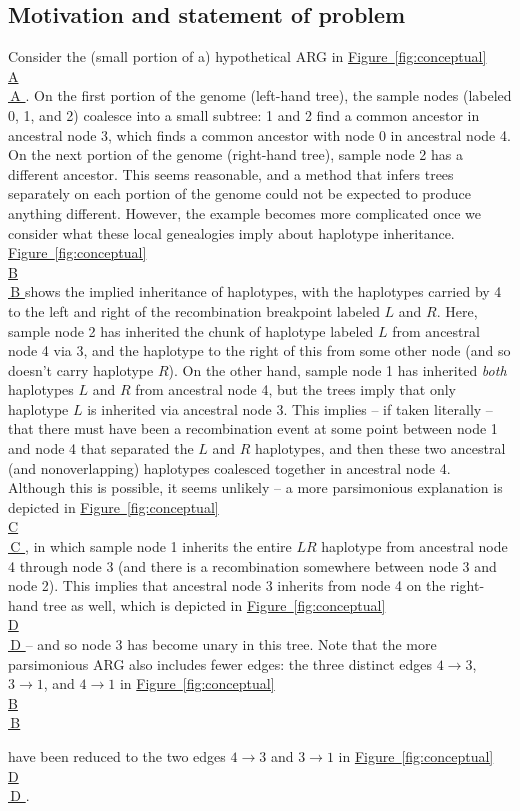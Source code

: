 \documentclass[10pt,twoside,lineno]{gsajnl}
\newcommand*{\figref}[2][]{%
	\hyperref[{#2}]{%
		Figure~\ref*{#2}%
		\ifx\\#1\\%
		\else
		\,#1%
		\fi
	}%
}
\begin{document}
\subsection{Motivation and statement of problem}


Consider the (small portion of a) hypothetical ARG in \figref[A]{fig:conceptual}.
On the first portion of the genome (left-hand tree), the sample nodes (labeled 0, 1, and 2)
coalesce into a small subtree: 1 and 2 find a common ancestor in ancestral node 3,
which finds a common ancestor with node 0 in ancestral node 4.
On the next portion of the genome (right-hand tree), sample node 2 has a different ancestor.
This seems reasonable, and a method that infers trees separately on each portion of the genome
could not be expected to produce anything different.
However, the example becomes more complicated once we consider what these local genealogies imply about haplotype inheritance.
\figref[B]{fig:conceptual} shows the implied inheritance of haplotypes,
with the haplotypes carried by 4 to the left and right of the recombination breakpoint labeled $L$ and $R$.
Here, sample node 2 has inherited the chunk of haplotype labeled $L$ from ancestral node 4 via 3,
and the haplotype to the right of this from some other node (and so doesn't carry haplotype $R$).
On the other hand, sample node 1 has inherited \emph{both} haplotypes $L$ and $R$
from ancestral node 4, but the trees imply that only haplotype $L$ is inherited via ancestral node 3.
This implies -- if taken literally -- that there must have been a recombination event
at some point between node 1 and node 4 that separated the $L$ and $R$ haplotypes,
and then these two ancestral (and nonoverlapping) haplotypes coalesced together in ancestral node 4.
Although this is possible, it seems unlikely --
a more parsimonious explanation is depicted in \figref[C]{fig:conceptual},
in which sample node 1 inherits the entire $LR$ haplotype from ancestral node 4 through node 3
(and there is a recombination somewhere between node 3 and node 2).
This implies that ancestral node 3 inherits from node 4 on the right-hand tree as well,
which is depicted in \figref[D]{fig:conceptual} --
and so node 3 has become unary in this tree.
Note that the more parsimonious ARG also includes fewer edges:
the three distinct edges $4 \to 3$, $3 \to 1$, and $4 \to 1$ in \figref[B]{fig:conceptual}
have been reduced to the two edges
$4 \to 3$ and $3 \to 1$ in \figref[D]{fig:conceptual}.
\end{document}
